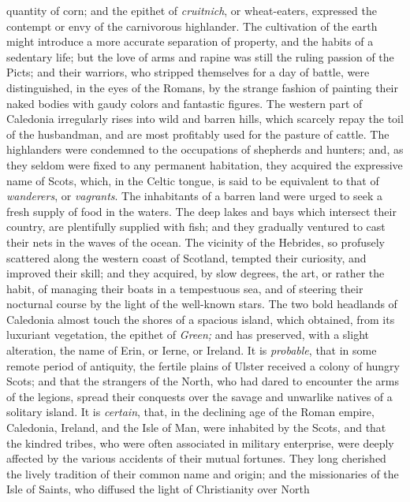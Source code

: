 {{{{{{{{{{{{{{{{{{{{{{{{{{{{{{{{{{{{{{{{{{{{{{{{{{{{{{{{{{{{{{{{{{{{{{{{{{{{{{{{{{{{{{{{{{{{{{{{{{{{{{{{{{{{{{{{{{{{{{quantity of corn; and the epithet of \textit{cruitnich}, or
wheat-eaters, expressed the contempt or envy of the carnivorous
highlander. The cultivation of the earth might introduce a more
accurate separation of property, and the habits of a sedentary
life; but the love of arms and rapine was still the ruling
passion of the Picts; and their warriors, who stripped themselves
for a day of battle, were distinguished, in the eyes of the
Romans, by the strange fashion of painting their naked bodies
with gaudy colors and fantastic figures. The western part of
Caledonia irregularly rises into wild and barren hills, which
scarcely repay the toil of the husbandman, and are most
profitably used for the pasture of cattle. The highlanders were
condemned to the occupations of shepherds and hunters; and, as
they seldom were fixed to any permanent habitation, they acquired
the expressive name of Scots, which, in the Celtic tongue, is
said to be equivalent to that of \textit{wanderers}, or \textit{vagrants}. The
inhabitants of a barren land were urged to seek a fresh supply of
food in the waters. The deep lakes and bays which intersect their
country, are plentifully supplied with fish; and they gradually
ventured to cast their nets in the waves of the ocean. The
vicinity of the Hebrides, so profusely scattered along the
western coast of Scotland, tempted their curiosity, and improved
their skill; and they acquired, by slow degrees, the art, or
rather the habit, of managing their boats in a tempestuous sea,
and of steering their nocturnal course by the light of the
well-known stars. The two bold headlands of Caledonia almost
touch the shores of a spacious island, which obtained, from its
luxuriant vegetation, the epithet of \textit{Green;} and has preserved,
with a slight alteration, the name of Erin, or Ierne, or Ireland.
It is \textit{probable}, that in some remote period of antiquity, the
fertile plains of Ulster received a colony of hungry Scots; and
that the strangers of the North, who had dared to encounter the
arms of the legions, spread their conquests over the savage and
unwarlike natives of a solitary island. It is \textit{certain}, that, in
the declining age of the Roman empire, Caledonia, Ireland, and
the Isle of Man, were inhabited by the Scots, and that the
kindred tribes, who were often associated in military enterprise,
were deeply affected by the various accidents of their mutual
fortunes. They long cherished the lively tradition of their
common name and origin; and the missionaries of the Isle of
Saints, who diffused the light of Christianity over North
}}}}}}}}}}}}}}}}}}}}}}}}}}}}}}}}}}}}}}}}}}}}}}}}}}}}}}}}}}}}}}}}}}}}}}}}}}}}}}}}}}}}}}}}}}}}}}}}}}}}}}}}}}}}}}}}}}}}}}
